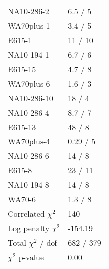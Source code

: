 \documentclass[14pt]{report}
\begin{document}
\begin{table}
\begin{center}
{\begin{tabular}{lp{2.57cm}}
  NA10-286-2 & 6.5 / 5  \\ 
  WA70plus-1 & 3.4 / 5  \\ 
  E615-1 & 11 / 10  \\ 
  NA10-194-1 & 6.7 / 6  \\ 
  E615-15 & 4.7 / 8  \\ 
  WA70plus-6 & 1.6 / 3  \\ 
  NA10-286-10 & 18 / 4  \\ 
  NA10-286-4 & 8.7 / 7  \\ 
  E615-13 & 48 / 8  \\ 
  WA70plus-4 & 0.29 / 5  \\ 
  NA10-286-6 & 14 / 8  \\ 
  E615-8 & 23 / 11  \\ 
  NA10-194-8 & 14 / 8  \\ 
  WA70-6 & 1.3 / 8  \\ 
  Correlated $\chi^2$  & 140  \\ 
  Log penalty $\chi^2$  & -154.19  \\ 
  \rowcolor{white}
      \midrule
  Total $\chi^2$ / dof  & 682 / 379  \\ 
  \rowcolor{white}
      \midrule
  $\chi^2$ p-value  & 0.00   \\ 
      \bottomrule
    \end{tabular}
  }
  \end{center}
\end{table}
\end{document}
